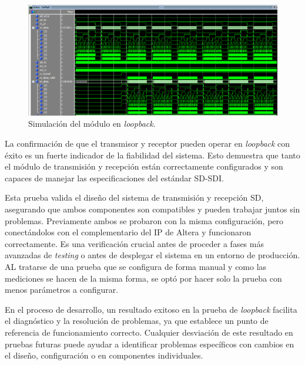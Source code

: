   \begin{figure}[h]
    \centering
    \includegraphics[width=1\textwidth]{./Figures/sdi_sd_full.png}
    \caption{Simulación del módulo en \textit{loopback}.}\label{fig:sd-full}
  \end{figure}

  La confirmación de que el transmisor y receptor pueden operar en \textit{loopback}
  con éxito es un fuerte indicador de la fiabilidad del sistema. Esto demuestra que
  tanto el módulo de transmisión y recepción están correctamente configurados y son
  capaces de manejar las especificaciones del estándar SD-SDI\@.

  Esta prueba valida el diseño del sistema de transmisión y recepción SD, asegurando
  que ambos componentes son compatibles y pueden trabajar juntos sin problemas.
  Previamente ambos se probaron con la misma configuración, pero conectándolos
  con el complementario del IP de Altera y funcionaron correctamente. Es una
  verificación crucial antes de proceder a fases más avanzadas de \textit{testing}
  o antes de desplegar el sistema en un entorno de producción. AL tratarse de una prueba
  que se configura de forma manual y como las mediciones se hacen de la misma forma, se optó
  por hacer solo la prueba con menos parámetros a configurar.

  En el proceso de desarrollo, un resultado exitoso en la prueba de \textit{loopback} facilita
  el diagnóstico y la resolución de problemas, ya que establece un punto de referencia
  de funcionamiento correcto. Cualquier desviación de este resultado en pruebas futuras
  puede ayudar a identificar problemas específicos con cambios en el diseño,
  configuración o en componentes individuales.


